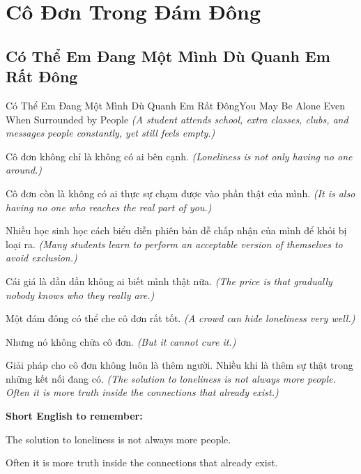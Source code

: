 \chapter{Cô Đơn Trong Đám Đông}

\section{Có Thể Em Đang Một Mình Dù Quanh Em Rất Đông}
\begin{truyen}{Có Thể Em Đang Một Mình Dù Quanh Em Rất Đông}{You May Be Alone Even When Surrounded by People}
\textit{(A student attends school, extra classes, clubs, and messages people constantly, yet still feels empty.)}

Cô đơn không chỉ là không có ai bên cạnh.
\textit{(Loneliness is not only having no one around.)}

Cô đơn còn là không có ai thực sự chạm được vào phần thật của mình.
\textit{(It is also having no one who reaches the real part of you.)}

Nhiều học sinh học cách biểu diễn phiên bản dễ chấp nhận của mình để khỏi bị loại ra.
\textit{(Many students learn to perform an acceptable version of themselves to avoid exclusion.)}

Cái giá là dần dần không ai biết mình thật nữa.
\textit{(The price is that gradually nobody knows who they really are.)}

Một đám đông có thể che cô đơn rất tốt.
\textit{(A crowd can hide loneliness very well.)}

Nhưng nó không chữa cô đơn.
\textit{(But it cannot cure it.)}

\end{truyen}

\begin{baihoc}
Giải pháp cho cô đơn không luôn là thêm người. Nhiều khi là thêm sự thật trong những kết nối đang có.
\textit{(The solution to loneliness is not always more people. Often it is more truth inside the connections that already exist.)}
\end{baihoc}

\begin{ghinhoanh}
\textbf{Short English to remember:}

The solution to loneliness is not always more people.

Often it is more truth inside the connections that already exist.

\end{ghinhoanh}

